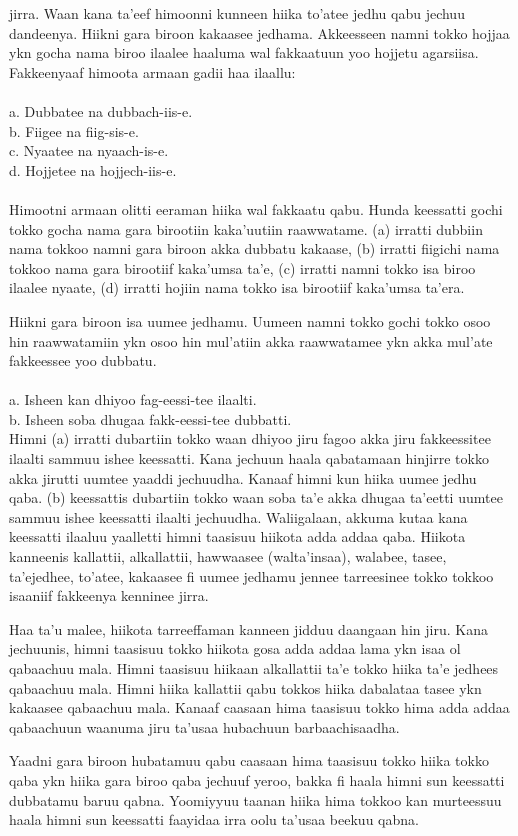 \documentclass[11pt,b5paper]{book}
\begin{document}
jirra. Waan kana ta’eef himoonni kunneen hiika to’atee jedhu qabu jechuu dandeenya. Hiikni gara biroon kakaasee jedhama. Akkeesseen namni tokko hojjaa ykn gocha nama biroo ilaalee haaluma wal fakkaatuun yoo hojjetu agarsiisa. Fakkeenyaaf himoota armaan gadii haa ilaallu: \\
\\
a. Dubbatee na dubbach-iis-e.\\
b. Fiigee na fiig-sis-e.\\
c. Nyaatee na nyaach-is-e.\\
d. Hojjetee na hojjech-iis-e.\\
\\
Himootni armaan olitti eeraman hiika wal fakkaatu qabu. Hunda keessatti gochi tokko gocha nama gara birootiin kaka’uutiin raawwatame. (a) irratti dubbiin nama tokkoo namni gara biroon akka dubbatu kakaase, (b) irratti fiigichi nama tokkoo nama gara birootiif kaka’umsa ta’e, (c) irratti namni
tokko isa biroo ilaalee nyaate, (d) irratti hojiin nama tokko isa birootiif kaka’umsa ta’era. 

Hiikni gara biroon isa uumee jedhamu. Uumeen namni tokko gochi tokko osoo hin raawwatamiin ykn osoo hin mul’atiin akka raawwatamee ykn akka mul’ate fakkeessee yoo dubbatu.\\
\\
a. Isheen kan dhiyoo fag-eessi-tee ilaalti.\\
b. Isheen soba dhugaa fakk-eessi-tee dubbatti.\\

Himni (a) irratti dubartiin tokko waan dhiyoo jiru fagoo akka jiru fakkeessitee ilaalti sammuu ishee keessatti. Kana jechuun haala qabatamaan hinjirre tokko akka jirutti uumtee yaaddi jechuudha. Kanaaf himni kun hiika uumee jedhu qaba. (b) keessattis dubartiin tokko waan soba ta’e akka dhugaa ta’eetti
uumtee sammuu ishee keessatti ilaalti jechuudha. Waliigalaan, akkuma kutaa kana keessatti ilaaluu yaalletti himni taasisuu hiikota adda addaa qaba. Hiikota kanneenis kallattii, alkallattii,
hawwaasee (walta’insaa), walabee, tasee, ta’ejedhee, to’atee, kakaasee fi uumee jedhamu jennee tarreesinee tokko tokkoo isaaniif fakkeenya kenninee jirra.

Haa ta’u malee, hiikota tarreeffaman kanneen jidduu daangaan hin jiru. Kana jechuunis, himni taasisuu tokko hiikota gosa adda addaa lama ykn isaa ol qabaachuu mala. Himni taasisuu hiikaan alkallattii ta’e tokko hiika ta’e jedhees qabaachuu mala. Himni hiika kallattii qabu tokkos hiika dabalataa tasee ykn
kakaasee qabaachuu mala. Kanaaf caasaan hima taasisuu tokko hima adda addaa qabaachuun waanuma jiru ta’usaa hubachuun barbaachisaadha.

Yaadni gara biroon hubatamuu qabu caasaan hima taasisuu tokko hiika tokko qaba ykn hiika gara biroo qaba jechuuf yeroo, bakka fi haala himni sun keessatti dubbatamu baruu qabna. Yoomiyyuu taanan hiika hima tokkoo kan murteessuu haala himni sun keessatti faayidaa irra oolu ta’usaa beekuu qabna.



\newpage



\end{document}
